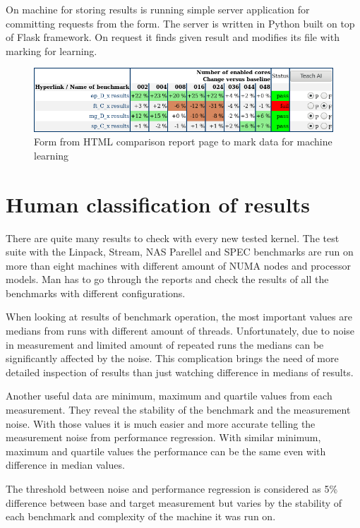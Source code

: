 On machine for storing results is running simple server application for
committing requests from the form. The server is written in Python built on top
of Flask framework. On request it finds given result and modifies its file with
marking for learning.

\begin{figure}
  \centering
  \includegraphics[width=12cm]{obrazky-figures/teaching_table}
  \caption{Form from HTML comparison report page to mark data for machine learning}
\end{figure}

\section{Human classification of results}
There are quite many results to check with every new tested kernel. The test
suite with the Linpack, Stream, NAS Parellel and SPEC benchmarks are run on more
than eight machines with different amount of NUMA nodes and processor models.
Man has to go through the reports and check the results of all the benchmarks
with different configurations.

When looking at results of benchmark operation, the most important values are
medians from runs with different amount of threads. Unfortunately, due to noise in measurement
and limited amount of repeated runs the medians can be significantly affected by
the noise. This complication brings the need of more detailed inspection of
results than just watching difference in medians of results.

Another useful data are minimum, maximum and quartile values from each
measurement. They reveal the stability of the benchmark and the measurement
noise. With those values it is much easier and more accurate telling the
measurement noise from performance regression. With similar minimum, maximum and
quartile values the performance can be the same even with difference in median values.

The threshold between noise and performance regression is considered as 5\%
difference between base and target measurement but varies by the stability of
each benchmark and complexity of the machine it was run on.

